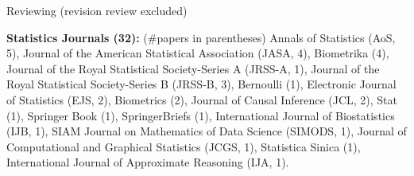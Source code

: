 \documentclass{article}
\begin{document}
\vspace{5mm}











\vspace{5mm}
\begin{large}
\noindent Reviewing (revision review excluded)
\end{large}

\vspace{2mm}
\noindent \textbf{Statistics Journals (32): }(\#papers in parentheses) Annals of Statistics (AoS, 5), Journal of the American Statistical Association (JASA, 4), Biometrika (4), Journal of the Royal Statistical Society-Series A (JRSS-A, 1), Journal of the Royal Statistical Society-Series B (JRSS-B, 3), Bernoulli (1), Electronic Journal of Statistics (EJS, 2), Biometrics (2), Journal of Causal Inference (JCL, 2), Stat (1), Springer Book (1), SpringerBriefs (1), International Journal of Biostatistics (IJB, 1), SIAM Journal on Mathematics of Data Science (SIMODS, 1), Journal of Computational and Graphical Statistics (JCGS, 1), Statistica Sinica (1), International Journal of Approximate Reasoning (IJA, 1).
\end{document}
